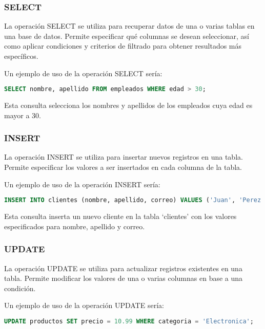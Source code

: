 \documentclass[executivepaper]{article}
\begin{document}
\subsubsection*{SELECT}

La operación SELECT se utiliza para recuperar datos de una o varias tablas en una base de datos. Permite especificar qué columnas se desean seleccionar, así como aplicar condiciones y criterios de filtrado para obtener resultados más específicos.

Un ejemplo de uso de la operación SELECT sería:

\begin{lstlisting}[language=SQL]
SELECT nombre, apellido FROM empleados WHERE edad > 30;
\end{lstlisting}

Esta consulta selecciona los nombres y apellidos de los empleados cuya edad es mayor a 30.

\subsubsection*{INSERT}

La operación INSERT se utiliza para insertar nuevos registros en una tabla. Permite especificar los valores a ser insertados en cada columna de la tabla.

Un ejemplo de uso de la operación INSERT sería:

\begin{lstlisting}[language=SQL]
INSERT INTO clientes (nombre, apellido, correo) VALUES ('Juan', 'Perez', 'juan@example.com');
\end{lstlisting}

Esta consulta inserta un nuevo cliente en la tabla \enquote*{clientes} con los valores especificados para nombre, apellido y correo.

\subsubsection*{UPDATE}

La operación UPDATE se utiliza para actualizar registros existentes en una tabla. Permite modificar los valores de una o varias columnas en base a una condición.

Un ejemplo de uso de la operación UPDATE sería:

\begin{lstlisting}[language=SQL]
UPDATE productos SET precio = 10.99 WHERE categoria = 'Electronica';
\end{lstlisting}
\end{document}
